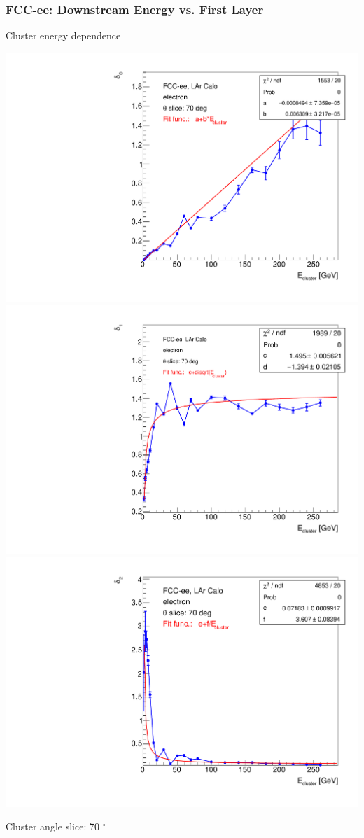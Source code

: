 \documentclass[aspectratio=169]{beamer}
\newcommand{\bluetext}[1]{%
  \textcolor{myBlue}{#1}
}
\newcommand{\redtext}[1]{%
  \textcolor{myRed}{#1}
}
\begin{document}
\begin{frame}
  \frametitle{FCC-ee: Downstream Energy vs. First Layer}

  \centering
  \redtext{Cluster energy dependence} \\[2.5ex]
  \begin{adjustwidth}{-5mm}{-5mm}
    \includegraphics[width=0.32\linewidth]{figures/2d/graph_downstream_energy_delta_0_70deg.pdf}
    \includegraphics[width=0.32\linewidth]{figures/2d/graph_downstream_energy_delta_1_70deg.pdf}
    \includegraphics[width=0.32\linewidth]{figures/2d/graph_downstream_energy_delta_2_70deg.pdf}
  \end{adjustwidth}
  \bluetext{Cluster angle slice: 70 $^{\circ}$}
\end{frame}
\end{document}

